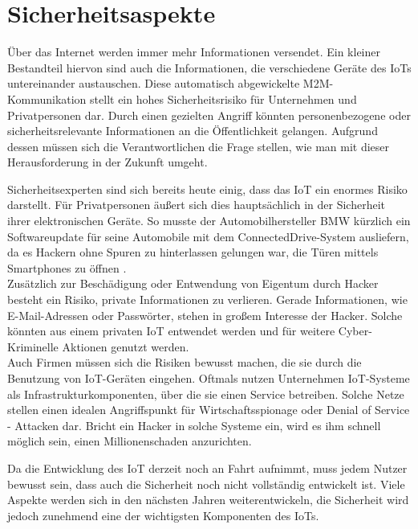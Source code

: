 \section{Sicherheitsaspekte}\label{s:Sicherheitsaspekte}

Über das Internet werden  immer mehr Informationen versendet. Ein kleiner Bestandteil hiervon sind auch die Informationen, die verschiedene Geräte des \ac{IoT}s untereinander austauschen.
Diese automatisch abgewickelte \ac{M2M}-Kommunikation stellt ein hohes Sicherheitsrisiko für Unternehmen und Privatpersonen dar. Durch einen gezielten Angriff könnten personenbezogene oder sicherheitsrelevante Informationen an die Öffentlichkeit gelangen. Aufgrund dessen müssen sich die Verantwortlichen die Frage stellen, wie man mit dieser Herausforderung in der Zukunft umgeht. 

Sicherheitsexperten sind sich bereits heute einig, dass das \ac{IoT} ein enormes Risiko darstellt\cite{ws:iotsec}. Für Privatpersonen äußert sich dies hauptsächlich in der Sicherheit ihrer elektronischen Geräte. So musste der Automobilhersteller BMW kürzlich ein Softwareupdate für seine Automobile mit dem ConnectedDrive-System ausliefern, da es Hackern ohne Spuren zu hinterlassen gelungen war, die Türen mittels Smartphones zu öffnen \cite{ws:zeitbmw}.\\

Zusätzlich zur Beschädigung oder Entwendung von Eigentum durch Hacker besteht ein Risiko, private Informationen zu verlieren. Gerade Informationen, wie E-Mail-Adressen oder Passwörter, stehen in großem Interesse der Hacker. Solche könnten aus einem privaten \ac{IoT} entwendet werden und für weitere Cyber-Kriminelle Aktionen genutzt werden. \\

Auch Firmen müssen sich die Risiken bewusst machen, die sie durch die Benutzung von \ac{IoT}-Geräten eingehen. Oftmals nutzen Unternehmen \ac{IoT}-Systeme als Infrastrukturkomponenten, über die sie einen Service betreiben. Solche Netze stellen einen idealen Angriffspunkt für Wirtschaftsspionage oder Denial of Service - Attacken dar. Bricht ein Hacker in solche Systeme ein, wird es ihm schnell möglich sein, einen Millionenschaden anzurichten.


Da die Entwicklung des \ac{IoT} derzeit noch an Fahrt aufnimmt, muss jedem Nutzer bewusst sein, dass auch die Sicherheit noch nicht vollständig entwickelt ist. Viele Aspekte werden sich in den nächsten Jahren weiterentwickeln, die Sicherheit wird jedoch zunehmend eine der wichtigsten Komponenten des \ac{IoT}s.\\


